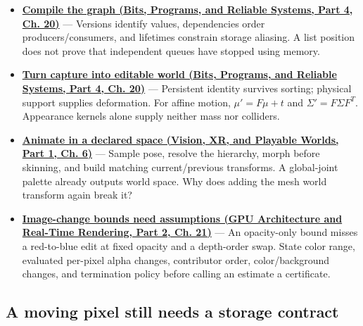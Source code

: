 \begin{itemize}
  \textbf{\href{../01-Bits-Programs-and-Reliable-Systems-P03/main.pdf\#nameddest=01-foundations-i-ch011-retire-a-resource-after-every-user-not-after-one-convenient-clock}{Retire across queues (Bits, Programs, and Reliable Systems, Part 3, Ch. 9)}} --- Every required queue counter must be reached. \((10,4,100)\) does not cover required \((9,5,3)\). Ownership preserves the payload; completion permits destruction.
\item
  \textbf{\href{../01-Bits-Programs-and-Reliable-Systems-P04/main.pdf\#nameddest=06-engine-ii-ch042-compile-a-render-graph-before-executing-it}{Compile the graph (Bits, Programs, and Reliable Systems, Part 4, Ch. 20)}} --- Versions identify values, dependencies order producers/consumers, and lifetimes constrain storage aliasing. A list position does not prove that independent queues have stopped using memory.
\item
  \textbf{\href{../01-Bits-Programs-and-Reliable-Systems-P04/main.pdf\#nameddest=06-engine-ii-ch042-rendering-identity-becomes-world-identity-only-through-an-explicit-bridge}{Turn capture into editable world (Bits, Programs, and Reliable Systems, Part 4, Ch. 20)}} --- Persistent identity survives sorting; physical support supplies deformation. For affine motion, \(\mu'=F\mu+t\) and \(\Sigma'=F\Sigma F^T\). Appearance kernels alone supply neither mass nor colliders.
\item
  \textbf{\href{../07-Vision-XR-and-Playable-Worlds-P01/main.pdf\#nameddest=04-visual-computing-ii-ch037-build-a-pose-first-then-deform-the-surface}{Animate in a declared space (Vision, XR, and Playable Worlds, Part 1, Ch. 6)}} --- Sample pose, resolve the hierarchy, morph before skinning, and build matching current/previous transforms. A global-joint palette already outputs world space. Why does adding the mesh world transform again break it?
\item
  \textbf{\href{../06-GPU-Architecture-and-Real-Time-Rendering-P02/main.pdf\#nameddest=06-engine-ii-ch045-an-image-change-certificate-must-name-the-edits-it-covers}{Image-change bounds need assumptions (GPU Architecture and Real-Time Rendering, Part 2, Ch. 21)}} --- An opacity-only bound misses a red-to-blue edit at fixed opacity and a depth-order swap. State color range, evaluated per-pixel alpha changes, contributor order, color/background changes, and termination policy before calling an estimate a certificate.
\end{itemize}

\subsection{A moving pixel still needs a storage contract}\label{appendix-a8f634b076b5-a-moving-pixel-still-needs-a-storage-contract}

